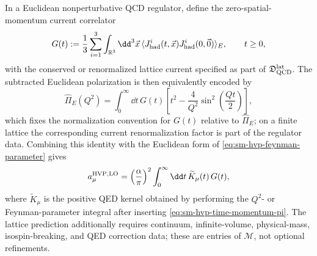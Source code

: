 \begin{definition}
\label{def:sm-muon-lattice-hvp-coordinate}
In a Euclidean nonperturbative QCD regulator, define the zero-spatial-momentum
current correlator
\begin{equation}
  G(t)
  :=
  \frac13\sum_{i=1}^3
  \int_{\mathbb R^3}\dd^3\vec x\,
  \langle J_{\rm had}^i(t,\vec x)J_{\rm had}^i(0,\vec0)\rangle_E ,
  \qquad t\ge0,
  \label{eq:sm-hvp-euclidean-gt}
\end{equation}
with the conserved or renormalized lattice current specified as part of
\(\mathfrak D_{\rm QCD}^{\rm lat}\).  The subtracted Euclidean polarization is
then equivalently encoded by
\begin{equation}
  \widehat\Pi_E(Q^2)
  =
  \int_0^\infty \dd t\,G(t)
  \left[
    t^2-\frac{4}{Q^2}\sin^2\!\left(\frac{Qt}{2}\right)
  \right],
  \label{eq:sm-hvp-time-momentum-pi}
\end{equation}
which fixes the normalization convention for \(G(t)\) relative to
\(\widehat\Pi_E\); on a finite lattice the corresponding current
renormalization factor is part of the regulator data.  Combining this
identity with the Euclidean form of \eqref{eq:sm-hvp-feynman-parameter} gives
\begin{equation}
  a_\mu^{\rm HVP,LO}
  =
  \left(\frac{\alpha}{\pi}\right)^2
  \int_0^\infty\dd t\,\widetilde K_\mu(t)\,G(t),
  \label{eq:sm-hvp-time-momentum}
\end{equation}
where \(\widetilde K_\mu\) is the positive QED kernel obtained by performing
the \(Q^2\)- or Feynman-parameter integral after inserting
\eqref{eq:sm-hvp-time-momentum-pi}.  The lattice prediction additionally
requires continuum, infinite-volume, physical-mass, isospin-breaking, and QED
correction data; these are entries of \(\mathcal M\), not optional refinements.
\end{definition}

